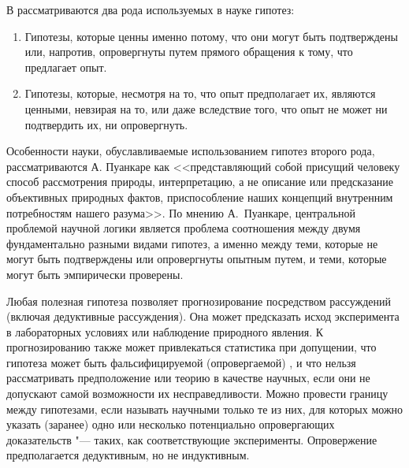 В \cite{Poincare2015} рассматриваются два рода используемых в науке гипотез: 

\begin{enumerate}
    \item Гипотезы, которые ценны именно потому, что они могут быть подтверждены или, напротив, опровергнуты путем 
        прямого обращения к тому, что предлагает опыт.
    \item Гипотезы, которые, несмотря на то, что опыт предполагает их, являются ценными, невзирая на то, или даже 
        вследствие того, что опыт не может ни подтвердить их, ни опровергнуть.
\end{enumerate}

Особенности науки, обуславливаемые использованием гипотез второго рода, рассматриваются А. Пуанкаре как <<представляющий 
собой присущий человеку способ рассмотрения природы, интерпретацию, а не описание или предсказание объективных 
природных фактов, приспособление наших концепций внутренним потребностям нашего разума>>. По мнению А.~Пуанкаре, 
центральной проблемой научной логики является проблема соотношения между двумя фундаментально разными видами гипотез, 
а именно между теми, которые не могут быть подтверждены или опровергнуты опытным путем, и теми, которые могут 
быть эмпирически проверены.

Любая полезная гипотеза позволяет прогнозирование посредством рассуждений (включая дедуктивные рассуждения). 
Она может предсказать исход эксперимента в лабораторных условиях или наблюдение природного явления. К прогнозированию 
также может привлекаться статистика при допущении, что гипотеза может быть 
фальсифицируемой (опровергаемой) \cite{Popper2005}, и что нельзя рассматривать предположение или теорию в качестве 
научных, если они не допускают самой возможности их несправедливости. Можно провести границу между гипотезами, если 
называть научными только те из них, для которых можно указать (заранее) одно или несколько потенциально 
опровергающих доказательств "--- таких, как соответствующие эксперименты. 
Опровержение предполагается дедуктивным, но не индуктивным.


